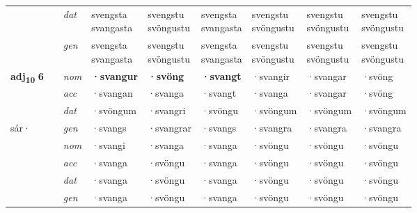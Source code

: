 \begin{longtable}{l>{\footnotesize\itshape}l>{\footnotesize\itshape}lXXXXXX}
 & & dat & \specialcell{svengsta\\ svangasta} & \specialcell{svengstu\\ svöngustu} & \specialcell{svengsta\\ svangasta} & \specialcell{svengstu\\ svöngustu} & \specialcell{svengstu\\ svöngustu} & \specialcell{svengstu\\ svöngustu} \\*
 & & gen & \specialcell{svengsta\\ svangasta} & \specialcell{svengstu\\ svöngustu} & \specialcell{svengsta\\ svangasta} & \specialcell{svengstu\\ svöngustu} & \specialcell{svengstu\\ svöngustu} & \specialcell{svengstu\\ svöngustu} \\
\midrule



\multirow{3}{*}{{{\textbf{adj{\textsubscript{10}}} \Large{\textbf{6}}}}} & \multirow{4}{*}{\begin{turn}{90}\textit{pos s}\end{turn}} & nom & \textbf{·svangur} & \textbf{·svöng} & \textbf{·svangt} & ·svangir & ·svangar & ·svöng \\*
 & & acc & ·svangan & ·svanga & ·svangt & ·svanga & ·svangar & ·svöng \\*
 & & dat & ·svöngum & ·svangri & ·svöngu & ·svöngum & ·svöngum & ·svöngum \\*
 \multirow{5}{*}{sár\allowbreak ·} & & gen & ·svangs & ·svangrar & ·svangs & ·svangra & ·svangra & ·svangra \\
\cmidrule(r){2-9}
& \multirow{4}{*}{\begin{turn}{90}\textit{pos w}\end{turn}} & nom & ·svangi & ·svanga & ·svanga & ·svöngu & ·svöngu & ·svöngu \\*
 & &  acc & ·svanga & ·svöngu & ·svanga & ·svöngu & ·svöngu & ·svöngu \\*
 & & dat & ·svanga & ·svöngu & ·svanga & ·svöngu & ·svöngu & ·svöngu \\*
 & & gen & ·svanga & ·svöngu & ·svanga & ·svöngu & ·svöngu & ·svöngu \\
\midrule




\end{longtable}
